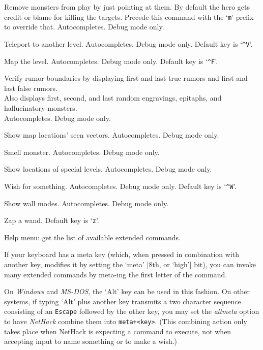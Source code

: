 Remove monsters from play by just pointing at them.
By default the hero gets credit or blame for killing the targets.
Precede this command with the `{\tt m}' prefix to override that.
Autocompletes.
Debug mode only.
\item[\tb{\#wizlevelport}]
Teleport to another level.
Autocompletes.
Debug mode only.
Default key is `{\tt \^{}V}'.
\item[\tb{\#wizmap}]
Map the level.
Autocompletes.
Debug mode only.
Default key is `{\tt \^{}F}'.
\item[\tb{\#wizrumorcheck}]
Verify rumor boundaries by displaying first and last true rumors and
first and last false rumors.\\
Also displays first, second, and last random engravings, epitaphs,
and hallucinatory monsters.\\
Autocompletes.
Debug mode only.
\item[\tb{\#wizseenv}]
Show map locations' seen vectors.
Autocompletes.
Debug mode only.
\item[\tb{\#wizsmell}]
Smell monster.
Autocompletes.
Debug mode only.
\item[\tb{\#wizwhere}]
Show locations of special levels.
Autocompletes.
Debug mode only.
\item[\tb{\#wizwish}]
Wish for something.
Autocompletes.
Debug mode only.
Default key is `{\tt \^{}W}'.
\item[\tb{\#wmode}]
Show wall modes.
Autocompletes.
Debug mode only.
\item[\tb{\#zap}]
Zap a wand. Default key is `{\tt z}'.
\item[\tb{\#?}]
Help menu:  get the list of available extended commands.
\elist

\nd If your keyboard has a meta key (which, when pressed in combination
with another key, modifies it by setting the `meta' [8th, or `high']
bit), you can invoke many extended commands by meta-ing the first
letter of the command.

On {\it Windows\/} and {\it MS-DOS\/},
the `Alt' key can be used in this fashion.
On other systems, if typing `Alt' plus another key transmits a
two character sequence consisting of an {\tt Escape}
followed by the other key, you may set the {\it altmeta\/}
option to have {\it NetHack\/} combine them into {\tt meta+<key>}.
(This combining action only takes place when NetHack is expecting a
command to execute, not when accepting input to name something or to
make a wish.)

